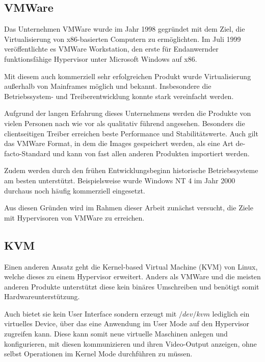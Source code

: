

		\subsection{VMWare}

		Das Unternehmen VMWare wurde im Jahr 1998 gegründet mit dem Ziel, die Virtualisierung von x86-basierten Computern zu ermöglichten.
		Im Juli 1999 veröffentlichte es VMWare Workstation, den erste für Endanwernder funktionsfähige Hypervisor unter Microsoft Windows auf x86.

		Mit diesem auch kommerziell sehr erfolgreichen Produkt wurde Virtualisierung außerhalb von Mainframes möglich und bekannt. 
		Insbesondere die Betriebssystem- und Treiberentwicklung konnte stark vereinfacht werden. 

		Aufgrund der langen Erfahrung dieses Unternehmens werden die Produkte von vielen Personen nach wie vor als qualitativ führend angesehen. 
		Besonders die clientseitigen Treiber erreichen beste Performance und Stabilitätswerte.
		Auch gilt das VMWare Format, in dem die Images gespeichert werden, als eine Art de-facto-Standard und kann von fast allen anderen Produkten importiert werden.

		Zudem werden durch den frühen Entwicklungsbeginn historische Betriebssysteme am besten unterstützt.
		Beispielsweise wurde Windows NT 4 im Jahr 2000 durchaus noch häufig kommerziell eingesetzt.

		Aus diesen Gründen wird im Rahmen dieser Arbeit zunächst versucht, die Ziele mit Hypervisoren von VMWare zu erreichen.

		\subsection{KVM}


		Einen anderen Ansatz geht die Kernel-based Virtual Machine (KVM) von Linux, welche dieses zu einem Hypervisor erweitert. 
		Anders als VMWare und die meisten anderen Produkte unterstützt diese kein binäres Umschreiben und benötigt somit Hardwareunterstützung.

		Auch bietet sie kein User Interface sondern erzeugt mit $/dev/kvm$ lediglich ein virtuelles Device, über das eine Anwendung im User Mode auf den Hypervisor zugreifen kann.
		Diese kann somit neue virtuelle Maschinen anlegen und konfigurieren, mit diesen kommunizieren und ihren Video-Output anzeigen, ohne selbst Operationen im Kernel Mode durchführen zu müssen.


